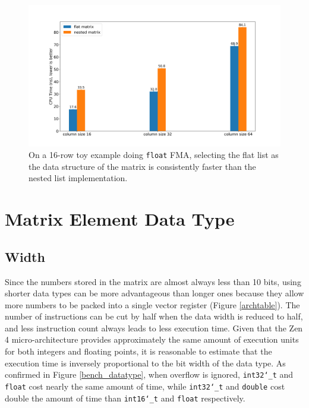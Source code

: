 \documentclass[logo,bsc,singlespacing,parskip]{infthesis}
\newcommand{\dtshort}{\texttt{int16\char`_t}}
\newcommand{\dtint}{\texttt{int32\char`_t}}
\newcommand{\dtfloat}{\texttt{float}}
\newcommand{\dtdouble}{\texttt{double}}
\begin{document}
\begin{figure}
    \includegraphics[width=\linewidth]{image/bench_nested_flat.png}
\caption{On a 16-row toy example doing \dtfloat{} FMA, selecting
the flat list as the data structure of the matrix is consistently faster than the
nested list implementation.  }
    \label{fig:nested-flat}
\end{figure}


\section{Matrix Element Data Type}


\subsection{Width}
\label{sec:width} 
Since the numbers stored in the matrix are almost always less than 10 bits,
using shorter data types can be more advantageous than longer ones because they
allow more numbers to be packed into a single vector register (Figure
\ref{archtable}). The number of instructions can be cut by half when the data width
is reduced to half, and less instruction count always leads to less execution
time. Given that the Zen 4 micro-architecture provides approximately the same amount
of execution units for both integers and floating points, it is reasonable to
estimate that the execution time is inversely proportional to the bit width of the
data type. As confirmed in Figure \ref{bench_datatype}, when overflow is
ignored, \dtint{} and \dtfloat{} cost nearly the same amount of time, while
\dtint{} and \dtdouble{} cost double the amount of time than \dtshort{} and
\dtfloat{} respectively.
\end{document}
